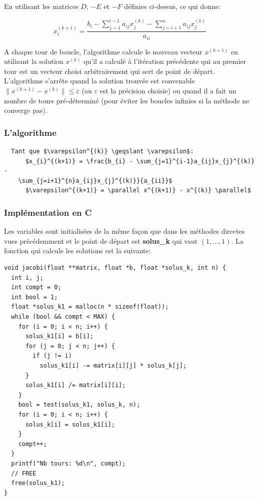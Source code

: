 \documentclass[a4paper]{article}
\begin{document}
En utilisant les matrices $D$, $-E$ et $-F$ définies ci-dessus, ce qui donne:

\[x_{i}^{(k+1)} = \frac{b_{i} - \sum_{j=1}^{i-1}a_{ij}x_{j}^{(k)} -
  \sum_{j=i+1}^{n}a_{ij}x_{j}^{(k)}}{a_{ii}}\]

A chaque tour de boucle, l'algorithme calcule le nouveau vecteur $x^{(k+1)}$ en
utilisant la solution $x^{(k)}$ qu'il a calculé à l'itération précédente qui au
premier tour est un vecteur choisi arbitrairement qui sert de point de
départ. L'algorithme s'arrête quand la solution trouvée est convenable
$\parallel x^{(k+1)} - x^{(k)} \parallel \leqslant \varepsilon$ (ou
$\varepsilon$ est la précision choisie) ou quand il a fait un nombre de tours
pré-déterminé (pour éviter les boucles infinies si la méthode ne converge pas).

\subsubsection{L'algorithme}

\begin{lstlisting}
  Tant que $\varepsilon^{(k)} \geqslant \varepsilon$:
      $x_{i}^{(k+1)} = \frac{b_{i} - \sum_{j=1}^{i-1}a_{ij}x_{j}^{(k)} -
    \sum_{j=i+1}^{n}a_{ij}x_{j}^{(k)}}{a_{ii}}$
      $\varepsilon^{(k+1)} = \parallel x^{(k+1)} - x^{(k)} \parallel$
\end{lstlisting}

\subsubsection{Implémentation en C}

Les variables sont initialisées de la même façon que dans les méthodes directes
vues précédemment et le point de départ est \textbf{solus\_k} qui vaut $(1,
\dots, 1)$. La fonction qui calcule les solutions est la suivante:

\begin{lstlisting}
void jacobi(float **matrix, float *b, float *solus_k, int n) {
  int i, j;
  int compt = 0;
  int bool = 1;
  float *solus_k1 = malloc(n * sizeof(float));
  while (bool && compt < MAX) {
    for (i = 0; i < n; i++) {
      solus_k1[i] = b[i];
      for (j = 0; j < n; j++) {
        if (j != i)
          solus_k1[i] -= matrix[i][j] * solus_k[j];
      }
      solus_k1[i] /= matrix[i][i];
    }
    bool = test(solus_k1, solus_k, n);
    for (i = 0; i < n; i++) {
      solus_k[i] = solus_k1[i];
    }
    compt++;
  }
  printf("Nb tours: %d\n", compt);
  // FREE
  free(solus_k1);
}
\end{lstlisting}
\end{document}
